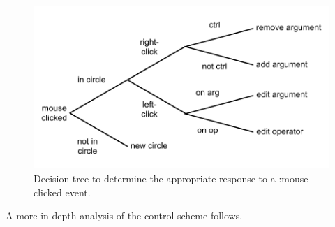 \documentclass[12pt,twoside,notitlepage,xetex]{report}
\begin{document}
\begin{center}
\begin{figure}[H]
\begin{center}
\includegraphics[width=\textwidth-4cm]{figs/nico_click.pdf}
\end{center}
\caption{Decision tree to determine the appropriate response to a {\ttfamily :mouse-clicked} event.}
\end{figure}
\end{center}

A more in-depth analysis of the control scheme follows.
\end{document}
